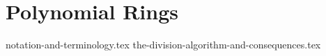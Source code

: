 \chapter{Polynomial Rings}
{notation-and-terminology.tex}
{the-division-algorithm-and-consequences.tex}
